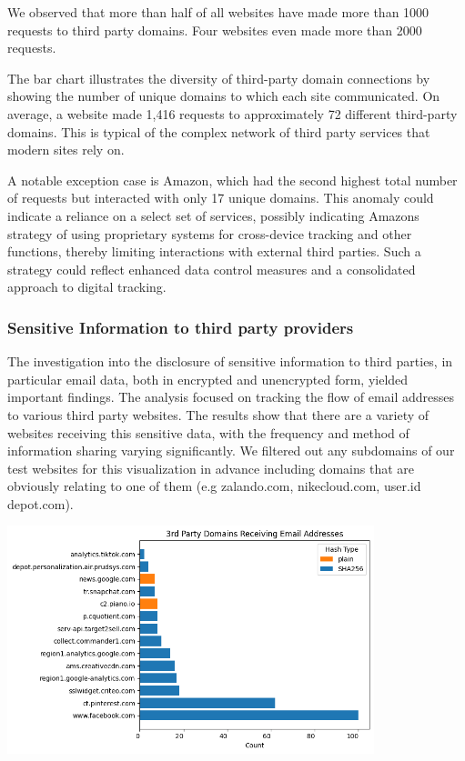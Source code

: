 We observed that more than half of all websites have made more than 1000 requests to third party domains. Four websites even made more than 2000 requests. 

The bar chart illustrates the diversity of third-party domain connections by showing the number of unique domains to which each site communicated. On average, a website made 1,416 requests to approximately 72 different third-party domains. This is typical of the complex network of third party services that modern sites rely on.

A notable exception case is Amazon, which had the second highest total number of requests but interacted with only 17 unique domains. This anomaly could indicate a reliance on a select set of services, possibly indicating Amazons strategy of using proprietary systems for cross-device tracking and other functions, thereby limiting interactions with external third parties. Such a strategy could reflect enhanced data control measures and a consolidated approach to digital tracking.

\subsubsection{Sensitive Information to third party providers}
The investigation into the disclosure of sensitive information to third parties, in particular email data, both in encrypted and unencrypted form, yielded important findings. The analysis focused on tracking the flow of email addresses to various third party websites. The results show that there are a variety of websites receiving this sensitive data, with the frequency and method of information sharing varying significantly. We filtered out any subdomains of our test websites for this visualization in advance including domains that are obviously relating to one of them (e.g zalando.com, nikecloud.com, user.id depot.com).

\vspace{0.5cm}
\includegraphics[width=0.8\textwidth]{./assets/thirdpartydomainsreceivingemailaddresses.png}
\vspace{0.5cm}

